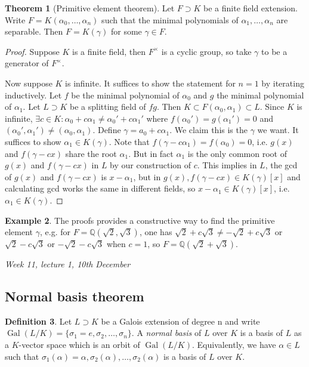 \documentclass{article}
\newcommand{\Q}{\mathbb{Q}}
\newcommand{\Gal}{\operatorname{Gal}}
\theoremstyle{definition}
\newtheorem{defn}{Definition}[subsection]
\newtheorem{thm}[defn]{Theorem}
\newtheorem{example}[defn]{Example}
\begin{document}
\begin{thm}[Primitive element theorem]
Let $F\supset K$ be a finite field extension. Write $F=K(\alpha_0,\ldots,\alpha_n)$ such that the minimal polynomials of $\alpha_1,\ldots,\alpha_n$ are separable. Then $F=K(\gamma)$ for some $\gamma\in F$.
\end{thm}
\begin{proof}
Suppose $K$ is a finite field, then $F^\times$ is a cyclic group, so take $\gamma$ to be a generator of $F^\times$.

Now suppose $K$ is infinite. It suffices to show the statement for $n=1$ by iterating inductively. Let $f$ be the minimal polynomial of $\alpha_0$ and $g$ the minimal polynomial of $\alpha_1$. Let $L\supset K$ be a splitting field of $fg$. Then $K\subset F(\alpha_0,\alpha_1)\subset L$. Since $K$ is infinite, $\exists c\in K:\alpha_0+c\alpha_1\neq \alpha_0'+c\alpha_1'$ where $f(\alpha_0')=g(\alpha_1')=0$ and $(\alpha_0',\alpha_1')\neq (\alpha_0,\alpha_1)$. Define $\gamma=a_0+c\alpha_1$. We claim this is the $\gamma$ we want. It suffices to show $\alpha_1\in K(\gamma)$. Note that $f(\gamma-c\alpha_1)=f(\alpha_0)=0$, i.e. $g(x)$ and $f(\gamma-cx)$ share the root $\alpha_1$. But in fact $\alpha_1$ is the only common root of $g(x)$ and $f(\gamma-cx)$ in $L$ by our construction of $c$. This implies in $L$, the gcd of $g(x)$ and $f(\gamma-cx)$ is $x-\alpha_1$, but in $g(x),f(\gamma-cx)\in K(\gamma)[x]$ and calculating gcd works the same in different fields, so $x-\alpha_1\in K(\gamma)[x]$, i.e. $\alpha_1\in K(\gamma)$.
\end{proof}

\begin{example}
The proofs provides a constructive way to find the primitive element $\gamma$, e.g. for $F=\Q(\sqrt 2,\sqrt 3)$, one has $\sqrt 2+c\sqrt 3\neq -\sqrt 2+c\sqrt 3$ or $\sqrt 2-c\sqrt 3$ or $-\sqrt 2-c\sqrt 3$ when $c=1$, so $F=\Q(\sqrt 2+\sqrt 3)$.
\end{example}

\begin{flushright}
\textit{Week 11, lecture 1, 10th December}
\end{flushright}

\subsection{Normal basis theorem}
\begin{defn}
Let $L\supset K$ be a Galois extension of degree n and write $\Gal(L/K)=\{\sigma_1=e,\sigma_2,\ldots,\sigma_n\}$. A \textit{normal basis} of $L$ over $K$ is a basis of $L$ as a $K$-vector space which is an orbit of $\Gal(L/K)$. Equivalently, we have $\alpha\in L$ such that $\sigma_1(\alpha)=\alpha,\sigma_2(\alpha),\ldots,\sigma_2(\alpha)$ is a basis of $L$ over $K$.
\end{defn}
\end{document}
